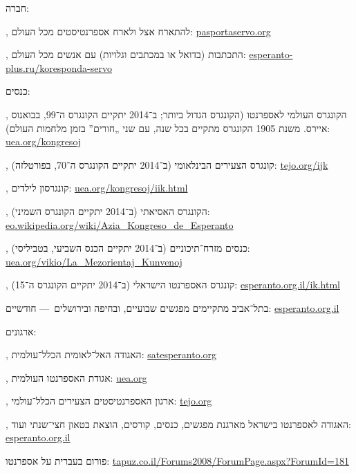 חברה:
\begin{compactitem}
\item {}, להתארח אצל ולארח אספרנטיסטים מכל העולם: \url{pasportaservo.org}
\item {}, התכתבות (בדואל או במכתבים וגלויות) עם אנשים מכל העולם: \url{esperanto-plus.ru/koresponda-servo}
\item כנסים:
	\begin{compactitem}
	\item {}, הקונגרס העולמי לאספרנטו (הקונגרס הגדול ביותר; ב־2014 יתקיים הקונגרס ה־99, בבואנוס איירס. משנת 1905 הקונגרס מתקיים בכל שנה, עם שני „חורים” בזמן מלחמות העולם): \url{uea.org/kongresoj}
	\item {}, קונגרס הצעירים הבינלאומי (ב־2014 יתקיים הקונגרס ה־70, בפורטלזה): \url{tejo.org/ijk}
	\item {}, קונגרסון לילדים: \url{uea.org/kongresoj/iik.html}
	\item {}, הקונגרס האסיאתי (ב־2014 יתקיים הקונגרס השמיני): \url{eo.wikipedia.org/wiki/Azia_Kongreso_de_Esperanto}
	\item {}, כנסים מזרח־תיכוניים (ב־2014 יתקיים הכנס השביעי, בטביליסי): \url{uea.org/vikio/La_Mezorientaj_Kunvenoj}
	\item {}, קונגרס האספרנטו הישראלי (ב־2014 יתקיים הקונגרס ה־15): \url{esperanto.org.il/ik.html}
	\item בתל־אביב מתקיימים מפגשים שבועיים, ובחיפה ובירושלים~— חודשיים: \url{esperanto.org.il}
	\end{compactitem}
\item ארגונים:
	\begin{compactitem}
	\item {}, האגודה האל־לאומית הכלל־עולמית: \url{satesperanto.org}
	\item {}, אגודת האספרנטו העולמית: \url{uea.org}
	\item {}, ארגון האספרנטיסטים הצעירים הכלל־עולמי: \url{tejo.org}
	\item {}, האגודה לאספרנטו בישראל מארגנת מפגשים, כנסים, קורסים, הוצאת בטאון חצי־שנתי ועוד: \url{esperanto.org.il}
	\end{compactitem}
\item פורום בעברית על אספרנטו: \url{tapuz.co.il/Forums2008/ForumPage.aspx?ForumId=181}
\end{compactitem}

\vfill

\begin{center}
\end{center}

